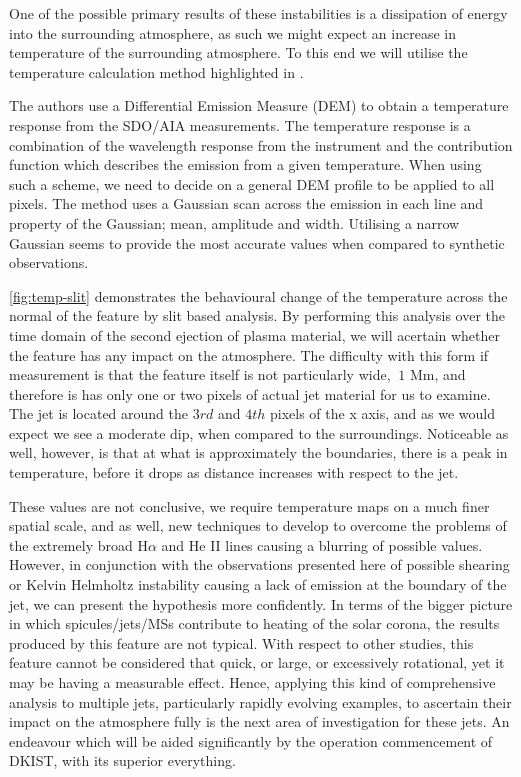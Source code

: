 One of the possible primary results of these instabilities is a dissipation of energy into the surrounding atmosphere, as such we might expect an increase in temperature of the surrounding atmosphere.
To this end we will utilise the temperature calculation method highlighted in \cite{Leonard2014}.

The authors use a Differential Emission Measure (DEM) to obtain a temperature response from the SDO/AIA measurements.
The temperature response is a combination of the wavelength response from the instrument and the contribution function which describes the emission from a given temperature.
When using such a scheme, we need to decide on a general DEM profile to be applied to all pixels.
The method uses a Gaussian scan across the emission in each line and property of the Gaussian; mean, amplitude and width. 
Utilising a narrow Gaussian seems to provide the most accurate values when compared to synthetic observations.

\cref{fig:temp-slit} demonstrates the behavioural change of the temperature across the normal of the feature by slit based analysis.
By performing this analysis over the time domain of the second ejection of plasma material, we will acertain whether the feature has any impact on the atmosphere.
The difficulty with this form if measurement is that the feature itself is not particularly wide, $~1$ Mm, and therefore is has only one or two pixels of actual jet material for us to examine.
The jet is located around the $3rd$ and $4th$ pixels of the x axis, and as we would expect we see a moderate dip, when compared to the surroundings. 
Noticeable as well, however, is that at what is approximately the boundaries, there is a peak in temperature, before it drops as distance increases with respect to the jet.

These values are not conclusive, we require temperature maps on a much finer spatial scale, and as well, new techniques to develop to overcome the problems of the extremely broad H$\alpha$ and He II lines causing a blurring of possible values.
However, in conjunction with the observations presented here of possible shearing or Kelvin Helmholtz instability causing a lack of emission at the boundary of the jet, we can present the hypothesis more confidently.
In terms of the bigger picture in which spicules/jets/MSs contribute to heating of the solar corona, the results produced by this feature are not typical.
With respect to other studies, this feature cannot be considered that quick, or large, or excessively rotational, yet it may be having a measurable effect.
Hence, applying this kind of comprehensive analysis to multiple jets, particularly rapidly evolving examples, to ascertain their impact on the atmosphere fully is the next area of investigation for these jets.
An endeavour which will be aided significantly by the operation commencement of DKIST, with its superior everything.
 


